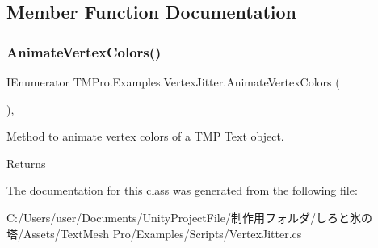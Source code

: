 \subsection{Member Function Documentation}
\mbox{\label{class_t_m_pro_1_1_examples_1_1_vertex_jitter_a65fcba6ff345a1a527b236c6166de696}} 
\subsubsection{\texorpdfstring{Animate\+Vertex\+Colors()}{AnimateVertexColors()}}
{\footnotesize\ttfamily I\+Enumerator T\+M\+Pro.\+Examples.\+Vertex\+Jitter.\+Animate\+Vertex\+Colors (\begin{DoxyParamCaption}{ }\end{DoxyParamCaption})\hspace{0.3cm}{\ttfamily [inline]}, {\ttfamily [private]}}



Method to animate vertex colors of a T\+MP Text object. 

\begin{DoxyReturn}{Returns}

\end{DoxyReturn}


The documentation for this class was generated from the following file\+:\begin{DoxyCompactItemize}
\item 
C\+:/\+Users/user/\+Documents/\+Unity\+Project\+File/制作用フォルダ/しろと氷の塔/\+Assets/\+Text\+Mesh Pro/\+Examples/\+Scripts/Vertex\+Jitter.\+cs\end{DoxyCompactItemize}
